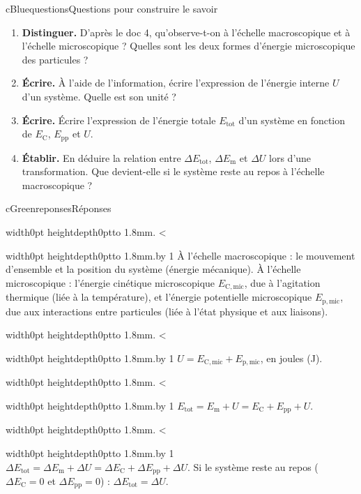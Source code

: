 \documentclass[11pt,a4paper]{article}
\newcommand{\Ec}{E_{\mathrm{C}}}
\newcommand{\kw}[1]{{\sffamily\bfseries\color{cBlue}#1}}   %
\newif\ifeleve
\newlength{\interligne}\setlength{\interligne}{7mm}
\newlength{\replen}
\newcommand{\pointilles}{{\color{cInk2!60}\leaders\hbox to 1.8mm{\hss.\hss}\hfill}\kern0pt}
\newcommand{\lignes}[1]{\leavevmode\vrule width0pt height\dimexpr\interligne-1mm\relax depth0pt\pointilles
  \lgn=1 \loop\ifnum\lgn<#1 \par\nointerlineskip\noindent\vrule width0pt height\interligne depth0pt\pointilles\advance\lgn by 1 \repeat}
\newcommand{\rep}[1]{%
  \ifeleve
    \sbox{\repbox}{\parbox{\linewidth}{#1}}%
    \replen=\dimexpr\ht\repbox+\dp\repbox\relax
    \repn=\numexpr\replen/\baselineskip+1\relax
    \ifnum\repn<2 \repn=2\fi
    \edef\nblignes{\the\repn}\lignes{\nblignes}%
  \else #1\fi}
\newcommand{\titrereponses}{\ifeleve Mes réponses\else Réponses\fi}
\newcommand{\Epp}{E_{\mathrm{pp}}}
\newcommand{\Em}{E_{\mathrm{m}}}
\newcommand{\Etot}{E_{\mathrm{tot}}}
\newcommand{\Ecmic}{E_{\mathrm{C,mic}}}
\newcommand{\Epmic}{E_{\mathrm{p,mic}}}
\begin{document}
\begin{rub}{cBlue}{questions}{Questions pour construire le savoir}
\begin{enumerate}
  \item \kw{Distinguer.} D’après le doc 4, qu’observe-t-on à l’échelle macroscopique et à l’échelle microscopique ? Quelles sont les deux formes d’énergie microscopique des particules ?
  \item \kw{Écrire.} À l’aide de l’information, écrire l’expression de l’énergie interne $U$ d’un système. Quelle est son unité ?
  \item \kw{Écrire.} Écrire l’expression de l’énergie totale $\Etot$ d’un système en fonction de $\Ec$, $\Epp$ et $U$.
  \item \kw{Établir.} En déduire la relation entre $\Delta\Etot$, $\Delta\Em$ et $\Delta U$ lors d’une transformation. Que devient-elle si le système reste au repos à l’échelle macroscopique ?
\end{enumerate}
\end{rub}

\begin{rub}{cGreen}{reponses}{\titrereponses}
\begin{reps}
  \item \rep{À l’échelle macroscopique : le mouvement d’ensemble et la position du système (énergie mécanique). À l’échelle microscopique : l’énergie cinétique microscopique $\Ecmic$, due à l’agitation thermique (liée à la température), et l’énergie potentielle microscopique $\Epmic$, due aux interactions entre particules (liée à l’état physique et aux liaisons).}
  \item \rep{$U = \Ecmic + \Epmic$, en joules (J).}
  \item \rep{$\Etot = \Em + U = \Ec + \Epp + U$.}
  \item \rep{$\Delta\Etot = \Delta\Em + \Delta U = \Delta\Ec + \Delta\Epp + \Delta U$. Si le système reste au repos ($\Delta\Ec = 0$ et $\Delta\Epp = 0$) : $\Delta\Etot = \Delta U$.}
\end{reps}
\end{rub}
\end{document}
